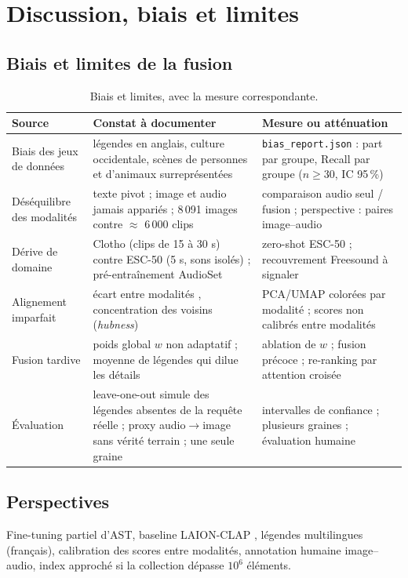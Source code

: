 \section{Discussion, biais et limites}\label{sec:discussion}
\subsection{Biais et limites de la fusion}
\begin{table}[ht]\centering\small
\begin{tabular}{@{}p{3.2cm}p{5.6cm}p{5.6cm}@{}}
\toprule
Source & Constat à documenter & Mesure ou atténuation\\
\midrule
Biais des jeux de données & légendes en anglais, culture occidentale, scènes de personnes et d'animaux surreprésentées & \texttt{bias\_report.json} : part par groupe, Recall par groupe ($n\ge30$, IC 95\,\%)\\
Déséquilibre des modalités & texte pivot ; image et audio jamais appariés ; 8\,091 images contre $\approx$ 6\,000 clips & comparaison audio seul / fusion ; perspective : paires image--audio\\
Dérive de domaine & Clotho (clips de 15 à 30 s) contre ESC-50 (5 s, sons isolés) ; pré-entraînement AudioSet & zero-shot ESC-50 ; recouvrement Freesound à signaler\\
Alignement imparfait & écart entre modalités \cite{liang2022gap}, concentration des voisins (\emph{hubness}) \cite{radovanovic2010hubs} & PCA/UMAP colorées par modalité ; scores non calibrés entre modalités\\
Fusion tardive & poids global $w$ non adaptatif ; moyenne de légendes qui dilue les détails & ablation de $w$ ; fusion précoce ; re-ranking par attention croisée\\
Évaluation & leave-one-out simule des légendes absentes de la requête réelle ; proxy audio$\to$image sans vérité terrain ; une seule graine & intervalles de confiance ; plusieurs graines ; évaluation humaine\\
\bottomrule
\end{tabular}
\caption{Biais et limites, avec la mesure correspondante.}
\end{table}

\subsection{Perspectives}
Fine-tuning partiel d'AST, baseline LAION-CLAP \cite{wu2023clap}, légendes multilingues (français), calibration des scores entre
modalités, annotation humaine image--audio, index approché si la collection dépasse $10^6$ éléments.
